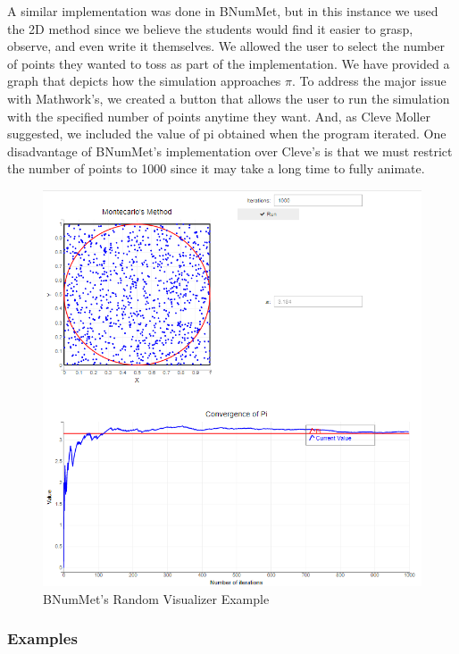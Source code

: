 A similar implementation was done in BNumMet, but in this instance we used the 2D method since we believe the students would find it easier to grasp, observe, and even write it themselves. We allowed the user to select the number of points they wanted to toss as part of the implementation. We have provided a graph that depicts how the simulation approaches $\pi$. To address the major issue with Mathwork's, we created a button that allows the user to run the simulation with the specified number of points anytime they want. And, as Cleve Moller suggested, we included the value of pi obtained when the program iterated. One disadvantage of BNumMet's implementation over Cleve's is that we must restrict the number of points to 1000 since it may take a long time to fully animate.
\begin{figure}[H]
    \centering
    \includegraphics[width=\textwidth]{Include/Images/Thesis/Development/Visualizers/RANDOMNESS/BNumMet.Random.Ex1.png}
    \caption{BNumMet's Random Visualizer Example}
    \label{fig:BNumMet's Random Visualizer Example}
\end{figure}
\subsubsection{Examples}
	
